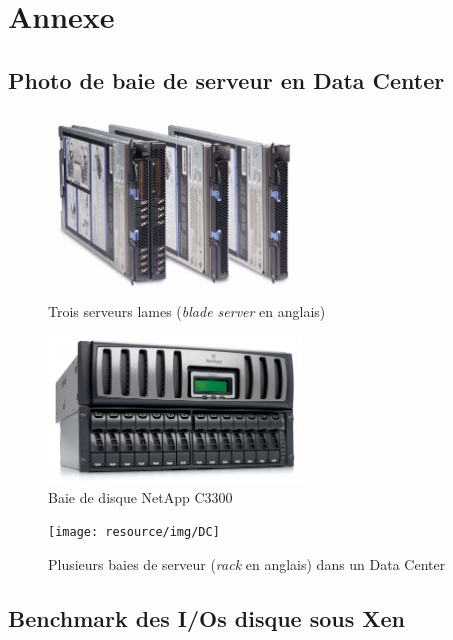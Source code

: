 \part{Annexe}

\chapter{Photo de baie de serveur en Data Center}
\label{rack}

\begin{figure}[H]
	\centering
	\includegraphics[width=0.6\textwidth]{resource/img/blade}
	\caption{Trois serveurs lames (\emph{blade server} en anglais)}
\end{figure}

\begin{figure}[H]
	\centering
	\includegraphics[width=0.6\textwidth]{resource/img/netapp_c3300}
	\caption{Baie de disque NetApp C3300}
\end{figure}

\begin{figure}[H]
	\centering
	\texttt{[image: resource/img/DC]}
	\caption{Plusieurs baies de serveur (\emph{rack} en anglais) dans un Data Center}
\end{figure}


\chapter{Benchmark des I/Os disque sous Xen}

